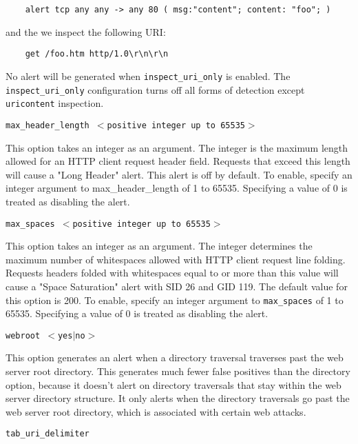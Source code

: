 \documentclass[english]{report}
\newcounter{slistnum}
\newenvironment{slist}
{ \begin{list}{ {\bf \arabic{slistnum}.} }{\usecounter{slistnum} } }
{ \end{list} }
\begin{document}
\begin{slist}
\begin{verbatim}
    alert tcp any any -> any 80 ( msg:"content"; content: "foo"; )
\end{verbatim}

and the we inspect the following URI:

\begin{verbatim}
    get /foo.htm http/1.0\r\n\r\n
\end{verbatim}

No alert will be generated when \texttt{inspect\_uri\_only} is enabled.  The
\texttt{inspect\_uri\_only} configuration turns off all forms of detection
except \texttt{uricontent} inspection.

\item \texttt{max\_header\_length $<$positive integer up to 65535$>$}

This option takes an integer as an argument.  The integer is the maximum length
allowed for an HTTP client request header field.  Requests that exceed this
length will cause a "Long Header" alert.  This alert is off by default.  To
enable, specify an integer argument to max\_header\_length of 1 to 65535.
Specifying a value of 0 is treated as disabling the alert.

\item \texttt{max\_spaces $<$positive integer up to 65535$>$}

This option takes an integer as an argument.  The integer determines the maximum number
of whitespaces allowed with HTTP client request line folding. Requests headers
folded with whitespaces equal to or more than this value will cause a
"Space Saturation" alert with SID 26 and GID 119.  The default value for this
option is 200.  To enable, specify an integer argument to \texttt{max\_spaces} of 1 to 65535.
Specifying a value of 0 is treated as disabling the alert.


\item \texttt{webroot $<$yes$|$no$>$}

This option generates an alert when a directory traversal traverses past the
web server root directory.  This generates much fewer false positives than the
directory option, because it doesn't alert on directory traversals that stay
within the web server directory structure.  It only alerts when the directory
traversals go past the web server root directory, which is associated with
certain web attacks.

\item \texttt{tab\_uri\_delimiter}


\end{slist}
\end{document}
